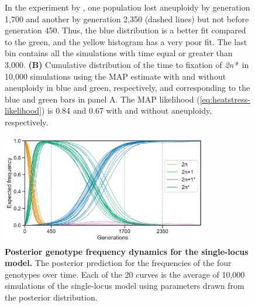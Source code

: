 \documentclass[12pt]{extarticle}
\newcommand{\eumt}{\emph{2n*}}
\begin{document}
\begin{figure}[h!]
{In the experiment by \citet{Yona2012}, one population lost aneuploidy by generation 1,700 and another by generation 2,350 (dashed lines) but not before generation 450. Thus, the blue distribution is a better fit compared to the green, and the yellow histogram has a very poor fit.
The last bin contains all the simulations with time equal or greater than 3,000.
    \textbf{(B)}
	Cumulative distribution of the time to fixation of \eumt\ in 10,000 simulations using the MAP estimate with and without aneuploidy in blue and green, respectively, and corresponding to the blue and green bars in panel A. The MAP likelihood (\autoref{eq:heatstress-likelihood}) is 0.84 and 0.67 with and without aneuploidy, respectively.
     }
  \label{fig:2n*-fixation}
\end{figure}

\begin{figure}[h!]
  \centering
\includegraphics[width=0.8\textwidth]{../figures/dynamics.pdf}
  \caption{
  \textbf{Posterior genotype frequency dynamics for the single-locus model.} 
  The posterior prediction for the frequencies of the four genotypes over time. Each of the 20 curves is the average of 10,000 simulations of the single-locus model using parameters drawn from the posterior distribution.
  }
  \label{fig:ppc-plot}
\end{figure}
\end{document}
